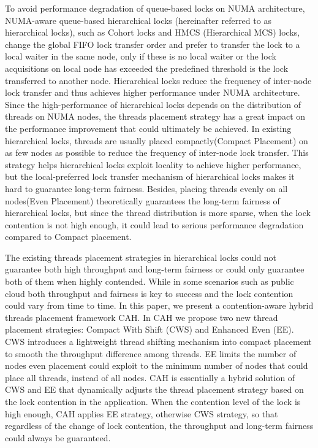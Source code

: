 \begin{englishabstract}
To avoid performance degradation of queue-based locks on NUMA architecture, NUMA-aware queue-based hierarchical locks (hereinafter referred to as hierarchical locks), such as Cohort locks and HMCS (Hierarchical MCS) locks, change the global FIFO lock transfer order and prefer to transfer the lock to a local waiter in the same node, only if these is no local waiter or the lock acquisitions on local node has exceeded the predefined threshold is the lock transferred to another node. Hierarchical locks reduce the frequency of inter-node lock transfer and thus achieves higher performance under NUMA architecture. Since the high-performance of hierarchical locks depends on the distribution of threads on NUMA nodes, the threads placement strategy has a great impact on the performance improvement that could ultimately be achieved. In existing hierarchical locks, threads are usually placed compactly(Compact Placement) on as few nodes as possible to reduce the frequency of inter-node lock transfer. This strategy helps hierarchical locks exploit locality to achieve higher performance, but the local-preferred lock transfer mechanism of hierarchical locks makes it hard to guarantee long-term fairness. Besides, placing threads evenly on all nodes(Even Placement) theoretically guarantees the long-term fairness of hierarchical locks, but since the thread distribution is more sparse, when the lock contention is not high enough, it could lead to serious performance degradation compared to Compact placement.

The existing threads placement strategies in hierarchical locks could not guarantee both high throughput and long-term fairness or could only guarantee both of them when highly contended. While in some scenarios such as public cloud both throughput and fairness is key to success and the lock contention could vary from time to time. In this paper, we present a contention-aware hybrid threads placement framework CAH.   In CAH we propose two new thread placement strategies: Compact With Shift (CWS) and Enhanced Even (EE). CWS introduces a lightweight thread shifting mechanism into compact placement to smooth the throughput difference among threads. EE limits the number of nodes even placement could exploit to the minimum number of nodes that could place all threads, instead of all nodes. CAH is essentially a hybrid solution of CWS and EE that dynamically adjusts the thread placement strategy based on the lock contention in the application. When the contention level of the lock is high enough, CAH applies EE strategy, otherwise CWS strategy, so that regardless of the change of lock contention, the throughput and long-term fairness could always be guaranteed.

\end{englishabstract}

